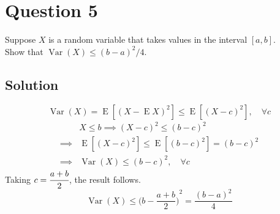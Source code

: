\section*{Question 5}

Suppose \(X\) is a random variable that takes values in the interval \([a, b]\).\\
Show that \( \operatorname{Var}{(X)} \leq {(b - a)}^2/4 \).

\subsection*{Solution}

\newcommand{\expectation}{\operatorname{E}}
\newcommand{\variance}{\operatorname{Var}}
\begin{equation*}
    \variance (X)
    =
    \expectation{[{(X - \expectation X)}^2]}
    \leq
    \expectation{[{(X - c)}^2]}, \quad \forall c
\end{equation*}
\begin{align*}
     &
    X \leq b
    \implies
    {(X - c)}^2 \leq {(b - c)}^2
    \\
    \implies
     &
    \expectation{[{(X - c)}^2]}
    \leq
    \expectation{[{(b - c)}^2]}
    =
    {(b - c)}^2
    \\
    \implies
     &
    \boxed{
        \variance (X) \leq {(b - c)}^2, \quad \forall c
    }
\end{align*}
Taking \( c = \cfrac{a+b}{2} \), the result follows.
\begin{equation*}
    \variance (X)
    \leq
    {\Big(b - \frac{a+b}{2} \Big)}^2
    =
    \frac{{(b-a)}^2}{4}
\end{equation*}
